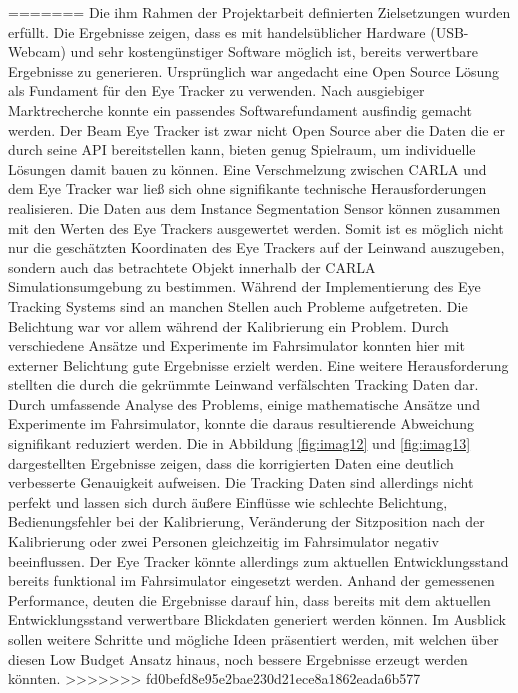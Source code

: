 =======
Die ihm Rahmen der Projektarbeit definierten Zielsetzungen wurden erfüllt. Die Ergebnisse zeigen, dass es mit handelsüblicher Hardware (USB-Webcam) und sehr kostengünstiger Software möglich ist, bereits verwertbare Ergebnisse zu generieren. Ursprünglich war angedacht eine Open Source Lösung als Fundament für den Eye Tracker zu verwenden. Nach ausgiebiger Marktrecherche konnte ein passendes Softwarefundament ausfindig gemacht werden. Der Beam Eye Tracker ist zwar nicht Open Source aber die Daten die er durch seine API bereitstellen kann, bieten genug Spielraum, um individuelle Lösungen damit bauen zu können. Eine Verschmelzung zwischen CARLA und dem Eye Tracker war ließ sich ohne signifikante technische Herausforderungen realisieren. Die Daten aus dem Instance Segmentation Sensor können zusammen mit den Werten des Eye Trackers ausgewertet werden. Somit ist es möglich nicht nur die geschätzten Koordinaten des Eye Trackers auf der Leinwand auszugeben, sondern auch das betrachtete Objekt innerhalb der CARLA Simulationsumgebung zu bestimmen.
Während der Implementierung des Eye Tracking Systems sind an manchen Stellen auch Probleme aufgetreten. Die Belichtung war vor allem während der Kalibrierung ein Problem. Durch verschiedene Ansätze und Experimente im Fahrsimulator konnten hier mit externer Belichtung gute Ergebnisse erzielt werden.
Eine weitere Herausforderung stellten die durch die gekrümmte Leinwand verfälschten Tracking Daten dar. Durch umfassende Analyse des Problems, einige mathematische Ansätze und Experimente im Fahrsimulator, konnte die daraus resultierende Abweichung signifikant reduziert werden. Die in Abbildung \ref{fig:imag12} und \ref{fig:imag13} dargestellten Ergebnisse zeigen, dass die korrigierten Daten eine deutlich verbesserte Genauigkeit aufweisen.
Die Tracking Daten sind allerdings nicht perfekt und lassen sich durch äußere Einflüsse wie schlechte Belichtung, Bedienungsfehler bei der Kalibrierung, Veränderung der Sitzposition nach der Kalibrierung oder zwei Personen gleichzeitig im Fahrsimulator negativ beeinflussen. Der Eye Tracker könnte allerdings zum aktuellen Entwicklungsstand bereits funktional im Fahrsimulator eingesetzt werden. Anhand der gemessenen Performance, deuten die Ergebnisse darauf hin, dass bereits mit dem aktuellen Entwicklungsstand verwertbare Blickdaten generiert werden können. Im Ausblick sollen weitere Schritte und mögliche Ideen präsentiert werden, mit welchen über diesen Low Budget Ansatz hinaus, noch bessere Ergebnisse erzeugt werden könnten.
>>>>>>> fd0befd8e95e2bae230d21ece8a1862eada6b577


